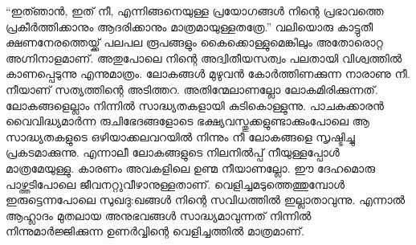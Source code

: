 “ഇത്ഞാന്‍, ഇത് നീ, എന്നിങ്ങനെയുള്ള പ്രയോഗങ്ങള്‍ നിന്റെ പ്രഭാവത്തെ പ്രകീര്‍ത്തിക്കാനും ആദരിക്കാനും മാത്രമായുള്ളതത്രേ.” വലിയൊരു കാട്ടുതീ ക്ഷണനേരത്തെയ്ക്ക് പലപല രൂപങ്ങളും കൈക്കൊള്ളുമെങ്കിലും അതോരൊറ്റ അഗ്നിനാളമാണ്. അതുപോലെ നിന്റെ അദ്വിതീയസത്വം പലതായി വിശ്വത്തില്‍ കാണപ്പെടുന്നു എന്നുമാത്രം. ലോകങ്ങള്‍ മുഴുവന്‍ കോര്‍ത്തിണക്കുന്ന നാരാണു നീ. നീയാണ് സത്യത്തിന്റെ അടിത്തറ. അതിന്മേലാണല്ലോ ലോകമിരിക്കുന്നത്. ലോകങ്ങളെല്ലാം നിന്നില്‍ സാദ്ധ്യതകളായി കുടികൊള്ളുന്നു. പാചകക്കാരന്‍ വൈവിദ്ധ്യമാര്‍ന്ന രുചിഭേദങ്ങളോടെ ഭക്ഷ്യവസ്തുക്കളുണ്ടാക്കുംപോലെ ആ സാദ്ധ്യതകളുടെ ഒഴിയാക്കലവറയില്‍ നിന്നും നീ ലോകങ്ങളെ സൃഷ്ടിച്ചു പ്രകടമാക്കുന്നു. എന്നാലീ  ലോകങ്ങളുടെ നിലനില്‍പ്പ്‌ നീയുള്ളപ്പോള്‍ മാത്രമേയുള്ളു. കാരണം അവകളിലെ ഉണ്മ നീയാണല്ലോ. ഈ ദേഹമൊരു പാഴ്ത്തടിപോലെ ജീവനറ്റുവീഴാനുള്ളതാണ്. വെളിച്ചമടുത്തെത്തുമ്പോള്‍  ഇരുട്ടെന്നപോലെ സുഖദു:ഖങ്ങള്‍ നിന്റെ സവിധത്തില്‍ ഇല്ലാതാവുന്നു. എന്നാല്‍ ആഹ്ലാദം മുതലായ അനുഭവങ്ങള്‍ സാദ്ധ്യമാവുന്നത് നിന്നില്‍ നിന്നുമാര്‍ജ്ജിക്കുന്ന ഉണര്‍വ്വിന്റെ വെളിച്ചത്തില്‍ മാത്രമാണ്. 